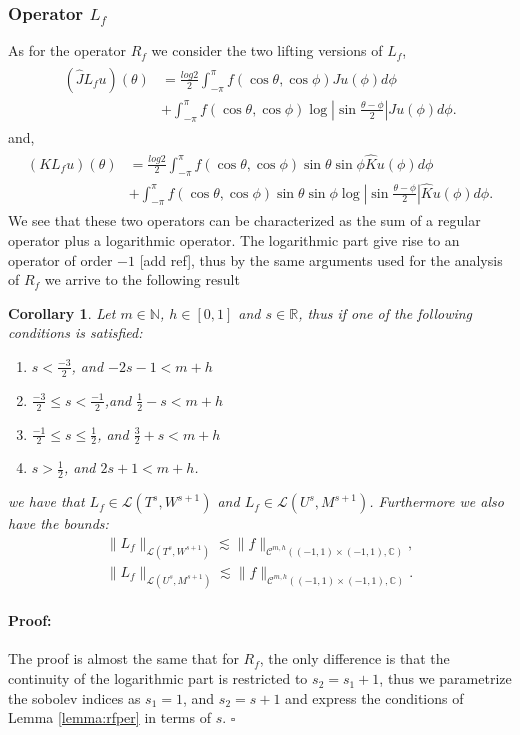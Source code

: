 \documentclass{article}
\newtheorem{corollary}[theorem]{Corollary}
\newenvironment{proof}{\paragraph{Proof:}}{\hfill$\square$}
\newcommand{\todo}[1]{{\color{red}[#1]}}
\newcommand{\IC}{{\mathbb C}}
\newcommand{\IN}{{\mathbb N}}
\newcommand{\IR}{{\mathbb R}}
\newcommand{\cmspaceh}[4]{\mathcal{C}^{#1,#2} \left( #3, #4 \right)}
\newcommand{\iinterv}{(-1,1)\times(-1,1)}
\begin{document}
\subsubsection{Operator $L_f$}

As for the operator $R_f$ we consider the two lifting versions of $L_f$, 
\begin{align}
\label{eq:Lsplit}
\begin{split}
(\widehat{J}L_fu)(\theta) &= \frac{log{2}}{2} \int_{-\pi}^{\pi} f(\cos \theta , \cos \phi) Ju(\phi) d\phi \\&+ \int_{-\pi}^{\pi} f(\cos \theta, \cos \phi) \log \left\vert \sin \frac{\theta-\phi}{2} \right\vert Ju(\phi) d\phi.
\end{split}
\end{align}
and, 
\begin{align}
\label{eq:Lsplitodd}
\begin{split}
(KL_fu)(\theta) &= \frac{log{2}}{2} \int_{-\pi}^{\pi} f(\cos \theta , \cos \phi)\sin \theta \sin \phi \widehat{K}u(\phi) d\phi \\&+ \int_{-\pi}^{\pi} f(\cos \theta, \cos \phi)\sin \theta \sin \phi \log \left\vert \sin \frac{\theta-\phi}{2} \right\vert \widehat{K}u(\phi) d\phi.
\end{split}
\end{align}
We see that these two operators can be characterized as the sum of a regular operator plus a logarithmic operator. The logarithmic part give rise to an operator of order $-1$ \todo{add ref}, thus by the same arguments used for the analysis of $R_f$ we arrive to the following result  

\begin{corollary}
\label{corollary:lfop}
Let $m \in \IN$, $h \in [0,1]$ and $s \in \IR$, thus if one of the following conditions is satisfied: 
\begin{enumerate}
\item $s< \frac{-3}{2}$, and $-2s-1 < m+h$
\item 
$\frac{-3}{2} \leq s < \frac{-1}{2}$,and  $ \frac{1}{2}-s < m+h$
\item 
$\frac{-1}{2} \leq s \leq \frac{1}{2}$, and $\frac{3}{2}+s < m+h$
\item 
$s > \frac{1}{2}$, and $2s + 1 < m+h$.
\end{enumerate}
we have that $ L_f  \in \mathcal{L}(T^{s},W^{s+1})$ and  $L_f  \in \mathcal{L}(U^{s},M^{s+1})$. Furthermore we also have the bounds: 
\begin{align*}
\| L_f\|_{ \mathcal{L}(T^{s},W^{s+1})} \lesssim \|f\|_{\cmspaceh{m}{h}{\iinterv}{\IC}},\\
\| L_f\|_{ \mathcal{L}(U^{s},M^{s+1})} \lesssim \|f\|_{\cmspaceh{m}{h}{\iinterv}{\IC}}.
\end{align*}
\end{corollary}
\begin{proof}
The proof is almost the same that for $R_f$, the only difference is that the continuity of the logarithmic part is restricted to $s_2 = s_1+1$, thus we parametrize the sobolev indices as $s_1 = 1$, and $s_2 = s+1$ and express the conditions of Lemma \ref{lemma:rfper} in terms of $s$. 
\end{proof}
\end{document}
